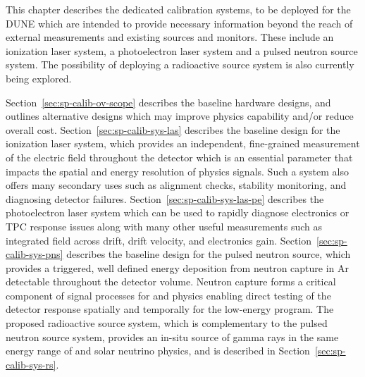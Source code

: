 This chapter describes the dedicated calibration systems, to be deployed for the DUNE \spmod which are intended to provide necessary information beyond the reach of external measurements and existing sources and monitors. These include an ionization laser system, a photoelectron laser system and a pulsed neutron source system. The possibility of deploying a radioactive source system is also currently being explored.  

Section~\ref{sec:sp-calib-ov-scope} describes the baseline hardware designs, and outlines alternative designs which may improve physics capability and/or reduce overall cost. Section~\ref{sec:sp-calib-sys-las} describes the baseline design for the ionization laser system, which provides an independent, fine-grained measurement of the electric field throughout the detector which is an essential parameter that impacts the spatial and energy resolution of physics signals. Such a system also offers many secondary uses such as alignment checks, stability monitoring, and diagnosing detector failures.
Section~\ref{sec:sp-calib-sys-las-pe} describes the photoelectron laser system which can be used to rapidly diagnose electronics or TPC response issues along with many other useful measurements such as integrated field across drift, drift velocity, and electronics gain. Section~\ref{sec:sp-calib-sys-pns} describes the baseline design for the pulsed neutron source, which provides a triggered, well defined energy deposition from neutron capture in Ar detectable throughout the detector volume. Neutron capture forms a critical component of signal processes for  and  physics enabling direct testing of the detector response spatially and temporally for the low-energy program. The proposed radioactive source system, which is complementary to the pulsed neutron source system, provides an in-situ source of gamma rays in the same energy range of
 and solar neutrino physics, and is described in Section~\ref{sec:sp-calib-sys-rs}. 

